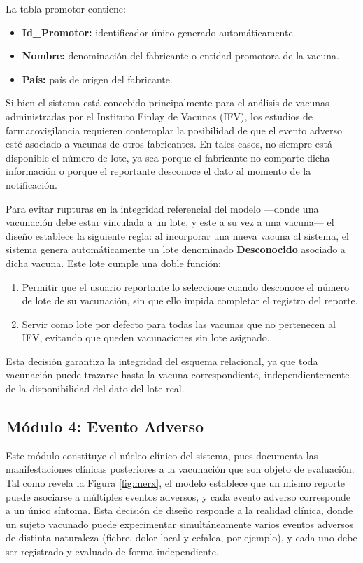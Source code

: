 La tabla promotor contiene:

\begin{itemize}
\item \textbf{Id\_Promotor:} identificador único generado automáticamente.
\item \textbf{Nombre:} denominación del fabricante o entidad promotora de la vacuna.
\item \textbf{País:} país de origen del fabricante.
\end{itemize}


Si bien el sistema está concebido principalmente para el análisis de vacunas administradas por el Instituto Finlay de Vacunas (IFV), los estudios de farmacovigilancia requieren contemplar la posibilidad de que el evento adverso esté asociado a vacunas de otros fabricantes. 
En tales casos, no siempre está disponible el número de lote, ya sea porque el fabricante no comparte dicha información o porque el reportante desconoce el dato al momento de la notificación.

Para evitar rupturas en la integridad referencial del modelo —donde una vacunación debe estar vinculada a un lote, y este a su vez a una vacuna— el diseño establece la siguiente regla: al incorporar una nueva vacuna al sistema, el sistema genera automáticamente un lote denominado \textbf{Desconocido} asociado a dicha vacuna.
Este lote cumple una doble función:

\begin{enumerate}
\item Permitir que el usuario reportante lo seleccione cuando desconoce el número de lote de su vacunación, sin que ello impida completar el registro del reporte.
\item Servir como lote por defecto para todas las vacunas que no pertenecen al IFV, evitando que queden vacunaciones sin lote asignado.
\end{enumerate}


Esta decisión garantiza la integridad del esquema relacional, ya que toda vacunación puede trazarse hasta la vacuna correspondiente, independientemente de la disponibilidad del dato del lote real.


\subsection{Módulo 4: Evento Adverso}
\label{subsection:modulo_evento}

Este módulo constituye el núcleo clínico del sistema, pues documenta las manifestaciones clínicas posteriores a la vacunación que son objeto de evaluación. 
Tal como revela la Figura \ref{fig:merx}, el modelo establece que un mismo reporte puede asociarse a múltiples eventos adversos, y cada evento adverso corresponde a un único síntoma. 
Esta decisión de diseño responde a la realidad clínica, donde un sujeto vacunado puede experimentar simultáneamente varios eventos adversos de distinta naturaleza (fiebre, dolor local y cefalea, por ejemplo), y cada uno debe ser registrado y evaluado de forma independiente.

